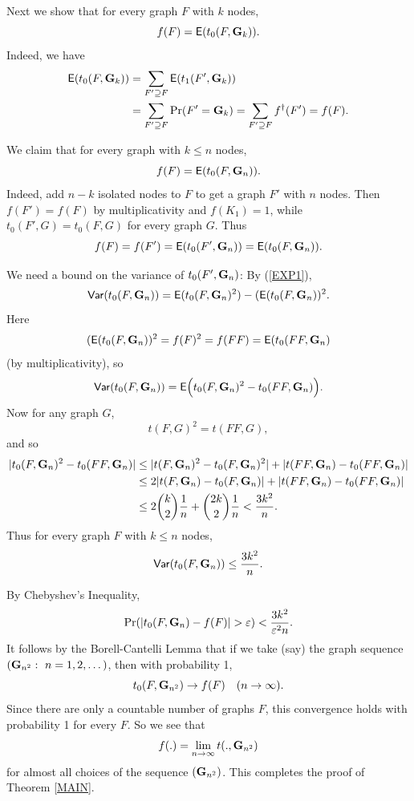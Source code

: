 \documentclass[fleqn]{article}
\begin{document}
Next we show that for every graph $F$ with $k$ nodes,
\begin{equation}\label{FIXN}
f(F)={\sf E}(t_0(F,{\mathbf G}_k)).
\end{equation}
Indeed, we have
\begin{align*}
{\sf E}(t_0(F,{\mathbf G}_k)) &= \sum_{F'\supseteq F} {\sf E}(t_1(F',{\mathbf G}_k)) \\
&=\sum_{F'\supseteq F} \Pr(F'={\mathbf G}_k)= \sum_{F'\supseteq
F}f^{\dagger}(F') =f(F).
\end{align*}

We claim that for every graph with $k\le n$ nodes,
\begin{equation}\label{EXP1}
f(F)={\sf E}(t_0(F,{\mathbf G}_n)).
\end{equation}
Indeed, add $n-k$ isolated nodes to $F$ to get a graph $F'$ with $n$
nodes. Then $f(F')=f(F)$ by multiplicativity and $f(K_1)=1$, while
$t_0(F',G)=t_0(F,G)$ for every graph $G$. Thus
\[
f(F)=f(F')={\sf E}(t_0(F',{\mathbf G}_n))={\sf E}(t_0(F,{\mathbf G}_n)).
\]

We need a bound on the variance of $t_0(F',{\mathbf G}_n)$: By (\ref{EXP1}),
\[
{\sf Var}(t_0(F,{\mathbf G}_n))={\sf E}(t_0(F,{\mathbf G}_n)^2)-({\sf E}(t_0(F,{\mathbf G}_n))^2.
\]
Here
\[
({\sf E}(t_0(F,{\mathbf G}_n))^2= f(F)^2=f(FF)={\sf E}(t_0(FF,{\mathbf G}_n)
\]
(by multiplicativity), so
\[
{\sf Var}(t_0(F,{\mathbf G}_n))={\sf E}\Bigl(t_0(F,{\mathbf G}_n)^2-t_0(FF,{\mathbf G}_n)\Bigr).
\]
Now for any graph $G$,
\[
t(F,G)^2=t(FF,G),
\]
and so
\begin{align*}
|t_0(F,{\mathbf G}_n)^2-t_0(FF,{\mathbf G}_n)| &\le
|t(F,{\mathbf G}_n)^2-t_0(F,{\mathbf G}_n)^2|+|t(FF,{\mathbf G}_n)-t_0(FF,{\mathbf G}_n)| \\
&\le 2|t(F,{\mathbf G}_n)-t_0(F,{\mathbf G}_n)|+|t(FF,{\mathbf G}_n)-t_0(FF,{\mathbf G}_n)|\\
& \le2\binom{k}{2}\frac{1}{n}+\binom{2k}{2}\frac{1}{n}
<\frac{3k^2}{n}.
\end{align*}
Thus for every graph $F$ with $k\le n$ nodes,
\begin{equation}\label{VAR1}
{\sf Var}(t_0(F,{\mathbf G}_n))\le \frac{3k^2}{n}.
\end{equation}

By Chebyshev's Inequality,
\[
\Pr(|t_0(F,\Ge_n)-f(F)|>\eps) <\frac{3k^2}{\eps^2 n}.
\]
It follows by the Borell-Cantelli Lemma that if we take (say) the
graph sequence $({\mathbf G}_{n^2}:~n=1,2,\dots)$, then with probability 1,
\[
t_0(F,{\mathbf G}_{n^2})\to f(F)\quad (n\to\infty).
\]
Since there are only a countable number of graphs $F$, this
convergence holds with probability 1 for every $F$. So we see that
\[
f(.)=\lim_{n\to\infty} t(.,{\mathbf G}_{n^2})
\]
for almost all choices of the sequence $({\mathbf G}_{n^2})$. This completes
the proof of Theorem \ref{MAIN}.
\end{document}
